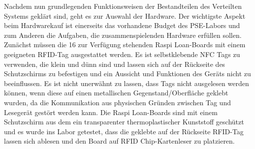 Nachdem nun grundlegenden Funktionsweisen der Bestandteilen des Verteilten Systems geklärt sind, geht es zur Auswahl der Hardware. Der wichtigste Aspekt beim Hardwarekauf ist einerseits das vorhandene Budget des PSE-Labors und zum Anderen die Aufgaben, die zusammenspielenden Hardware erfüllen sollen. Zunächst müssen die 16 zur Verfügung stehenden Raspi Loan-Boards mit einem geeigneten RFID-Tag ausgestattet werden. Es ist selbstklebende NFC Tags zu verwenden, die klein und dünn sind und lassen sich auf der Rückseite des Schutzschirms zu befestigen und ein Aussicht und Funktionen des Geräts nicht zu beeinflussen. Es ist nicht unerwähnt zu lassen, dass Tags nicht ausgelesen werden können, wenn diese auf einen metallischen Gegenstand/Oberfläche geklebt wurden, da die Kommunikation aus physischen Gründen zwischen Tag und Lesegerät gestört werden kann. Die Raspi Loan-Boards sind mit einem Schutzschirm aus dem ein transparenter thermoplastischer Kunststoff geschützt und es wurde ins Labor getestet, dass die geklebte auf der Rückseite RFID-Tag lassen sich ablesen und den Board auf RFID Chip-Kartenleser zu platzieren. 